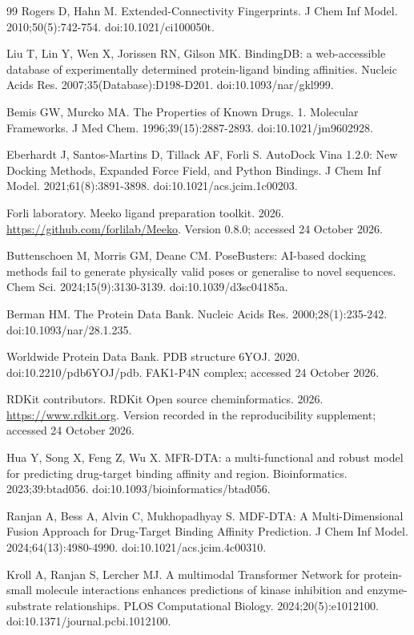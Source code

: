 \documentclass[12pt,a4paper]{article}
\begin{document}
\begin{thebibliography}{99}
 Rogers D, Hahn M. Extended-Connectivity Fingerprints. J Chem Inf Model. 2010;50(5):742-754. doi:10.1021/ci100050t.

 Liu T, Lin Y, Wen X, Jorissen RN, Gilson MK. BindingDB: a web-accessible database of experimentally determined protein-ligand binding affinities. Nucleic Acids Res. 2007;35(Database):D198-D201. doi:10.1093/nar/gkl999.

 Bemis GW, Murcko MA. The Properties of Known Drugs. 1. Molecular Frameworks. J Med Chem. 1996;39(15):2887-2893. doi:10.1021/jm9602928.

 Eberhardt J, Santos-Martins D, Tillack AF, Forli S. AutoDock Vina 1.2.0: New Docking Methods, Expanded Force Field, and Python Bindings. J Chem Inf Model. 2021;61(8):3891-3898. doi:10.1021/acs.jcim.1c00203.

 Forli laboratory. Meeko ligand preparation toolkit. 2026. \url{https://github.com/forlilab/Meeko}. Version 0.8.0; accessed 24 October 2026.

 Buttenschoen M, Morris GM, Deane CM. PoseBusters: AI-based docking methods fail to generate physically valid poses or generalise to novel sequences. Chem Sci. 2024;15(9):3130-3139. doi:10.1039/d3sc04185a.

 Berman HM. The Protein Data Bank. Nucleic Acids Res. 2000;28(1):235-242. doi:10.1093/nar/28.1.235.

 Worldwide Protein Data Bank. PDB structure 6YOJ. 2020. doi:10.2210/pdb6YOJ/pdb. FAK1-P4N complex; accessed 24 October 2026.

 RDKit contributors. RDKit Open source cheminformatics. 2026. \url{https://www.rdkit.org}. Version recorded in the reproducibility supplement; accessed 24 October 2026.

 Hua Y, Song X, Feng Z, Wu X. MFR-DTA: a multi-functional and robust model for predicting drug-target binding affinity and region. Bioinformatics. 2023;39:btad056. doi:10.1093/bioinformatics/btad056.

 Ranjan A, Bess A, Alvin C, Mukhopadhyay S. MDF-DTA: A Multi-Dimensional Fusion Approach for Drug-Target Binding Affinity Prediction. J Chem Inf Model. 2024;64(13):4980-4990. doi:10.1021/acs.jcim.4c00310.

 Kroll A, Ranjan S, Lercher MJ. A multimodal Transformer Network for protein-small molecule interactions enhances predictions of kinase inhibition and enzyme-substrate relationships. PLOS Computational Biology. 2024;20(5):e1012100. doi:10.1371/journal.pcbi.1012100.
\end{thebibliography}
\end{document}
